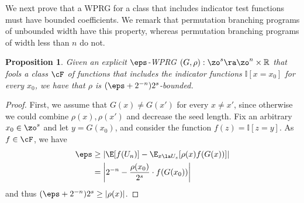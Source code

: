 \documentclass[11pt]{article}
\newtheorem{proposition}[theorem]{Proposition}
\newcommand{\R}{{\mathbb R}}
\begin{document}
We next prove that a WPRG for a class that includes indicator test functions must have bounded coefficients. We remark that permutation branching programs %
of  %
unbounded width have this property, whereas permutation branching programs of width less
than $n$ do not. 
\begin{proposition}
  Given an explicit $\eps$-WPRG $(G,\rho):\zo^s\ra\zo^n\times \R$ that fools a
%
class $\cF$ of functions   %
that includes the indicator functions $\mathbb{I}[x=x_0]$ for every $x_0$, we have that $\rho$ is $(\eps+2^{-n})2^{s}$-bounded.
\end{proposition}
\begin{proof}
    First, we assume that $G(x)\neq G(x')$ for every $x\neq x'$, since otherwise we could combine $\rho(x),\rho(x')$ and decrease the seed length. Fix an arbitrary $x_0\in \zo^s$ and let $y=G(x_0)$, and consider the function $f(z)=\mathbb{I}[z=y]$. As $f\in \cF$, we have
    \begin{align*}
        \eps &\geq \left|\E[f(U_n)] - \E_{x\la U_s}[\rho(x)f(G(x))] \right|\\
        &= \left|2^{-n}-\frac{\rho(x_0)}{2^s}\cdot %
        f(G(x_0))\right|
    \end{align*}
    and thus $(\eps+2^{-n})2^s\geq |\rho(x)|$.
\end{proof}
\end{document}
